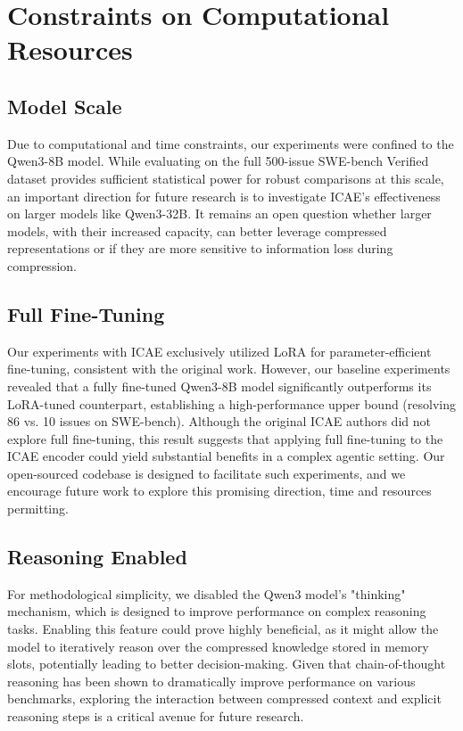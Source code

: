 \section{Constraints on Computational Resources}

\subsection{Model Scale}
Due to computational and time constraints, our experiments were confined to the Qwen3-8B model. While evaluating on the full 500-issue SWE-bench Verified dataset provides sufficient statistical power for robust comparisons at this scale, an important direction for future research is to investigate ICAE's effectiveness on larger models like Qwen3-32B. It remains an open question whether larger models, with their increased capacity, can better leverage compressed representations or if they are more sensitive to information loss during compression.

\subsection{Full Fine-Tuning}
Our experiments with ICAE exclusively utilized LoRA for parameter-efficient fine-tuning, consistent with the original work. However, our baseline experiments revealed that a fully fine-tuned Qwen3-8B model significantly outperforms its LoRA-tuned counterpart, establishing a high-performance upper bound (resolving 86 vs. 10 issues on SWE-bench). Although the original ICAE authors did not explore full fine-tuning, this result suggests that applying full fine-tuning to the ICAE encoder could yield substantial benefits in a complex agentic setting. Our open-sourced codebase is designed to facilitate such experiments, and we encourage future work to explore this promising direction, time and resources permitting.

\subsection{Reasoning Enabled}
For methodological simplicity, we disabled the Qwen3 model's "thinking" mechanism, which is designed to improve performance on complex reasoning tasks. Enabling this feature could prove highly beneficial, as it might allow the model to iteratively reason over the compressed knowledge stored in memory slots, potentially leading to better decision-making. Given that chain-of-thought reasoning has been shown to dramatically improve performance on various benchmarks, exploring the interaction between compressed context and explicit reasoning steps is a critical avenue for future research.


